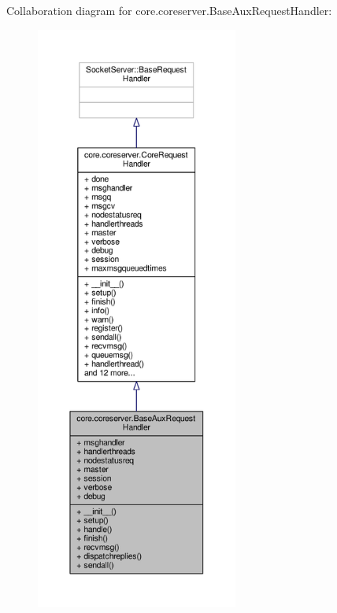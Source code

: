 Collaboration diagram for core.\+coreserver.\+Base\+Aux\+Request\+Handler\+:
\nopagebreak
\begin{figure}[H]
\begin{center}
\leavevmode
\includegraphics[height=550pt]{classcore_1_1coreserver_1_1_base_aux_request_handler__coll__graph}
\end{center}
\end{figure}
